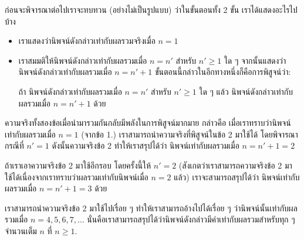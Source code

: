 ก่อน{\wbr}จะ{\wbr}พิจารณา{\wbr}ต่อไป{\wbr}เรา{\wbr}จะ{\wbr}ทบทวน (อย่าง{\wbr}ไม่{\wbr}เป็น{\wbr}รูปแบบ) ว่า{\wbr}ใน{\wbr}ขั้นตอน{\wbr}ทั้ง 2 ขั้น เรา{\wbr}ได้{\wbr}แสดง{\wbr}อะไร{\wbr}ไป{\wbr}บ้าง{\wbr}

\begin{itemize}
\item เรา{\wbr}แสดง{\wbr}ว่า{\wbr}นิพจน์{\wbr}ดังกล่าว{\wbr}เท่า{\wbr}กับ{\wbr}ผลรวม{\wbr}จริง{\wbr}เมื่อ $ n=1 $
\item เรา{\wbr}สมมติ{\wbr}ให้{\wbr}นิพจน์{\wbr}ดังกล่าว{\wbr}เท่า{\wbr}กับ{\wbr}ผลรวม{\wbr}เมื่อ $ n=n' $ สำหรับ $ n'\geq 1 $ ใด ๆ จากนั้น{\wbr}แสดง{\wbr}ว่า{\wbr}นิพจน์{\wbr}ดังกล่าว{\wbr}เท่า{\wbr}กับ{\wbr}ผลรวม{\wbr}เมื่อ $ n=n'+1 $ ขั้นตอน{\wbr}นี้{\wbr}กล่าว{\wbr}ใน{\wbr}อีก{\wbr}ทาง{\wbr}หนึ่ง{\wbr}ก็{\wbr}คือ{\wbr}การ{\wbr}พิสูจน์{\wbr}ว่า:

ถ้า นิพจน์{\wbr}ดังกล่าว{\wbr}เท่า{\wbr}กับ{\wbr}ผลรวม{\wbr}เมื่อ $ n=n' $ สำหรับ $ n'\geq 1 $ ใด ๆ แล้ว นิพจน์{\wbr}ดังกล่าว{\wbr}เท่า{\wbr}กับ{\wbr}ผลรวม{\wbr}เมื่อ $ n=n'+1 $ ด้วย{\wbr}
\end{itemize}

ความจริง{\wbr}ทั้ง{\wbr}สอง{\wbr}ข้อ{\wbr}เมื่อ{\wbr}นำมา{\wbr}รวม{\wbr}กัน{\wbr}กลับ{\wbr}มี{\wbr}พลัง{\wbr}ใน{\wbr}การ{\wbr}พิสูจน์{\wbr}มากมาย กล่าวคือ{\wbr}
เมื่อ{\wbr}เรา{\wbr}ทราบ{\wbr}ว่า{\wbr}นิพจน์{\wbr}เท่า{\wbr}กับ{\wbr}ผลรวม{\wbr}เมื่อ $ n=1 $ (จาก{\wbr}ข้อ 1.)
เรา{\wbr}สามารถ{\wbr}นำ{\wbr}ความจริง{\wbr}ที่{\wbr}พิสูจน์{\wbr}ใน{\wbr}ข้อ 2 มา{\wbr}ใช้ได้ โดย{\wbr}พิจารณา{\wbr}กรณี{\wbr}ที่ $ n'=1 $
ดังนั้น{\wbr}ความจริง{\wbr}ข้อ 2 ทำ{\wbr}ให้{\wbr}เรา{\wbr}สรุป{\wbr}ได้{\wbr}ว่า นิพจน์{\wbr}เท่า{\wbr}กับ{\wbr}ผลรวม{\wbr}เมื่อ $ n=n'+1=2 $

ถ้า{\wbr}เรา{\wbr}เอา{\wbr}ความจริง{\wbr}ข้อ 2 มา{\wbr}ใช้{\wbr}อีก{\wbr}รอบ โดย{\wbr}ครั้งนี้{\wbr}ให้ $ n'=2 $
(สังเกต{\wbr}ว่า{\wbr}เรา{\wbr}สามารถ{\wbr}ความจริง{\wbr}ข้อ 2 มา{\wbr}ใช้ได้{\wbr}เนื่องจาก{\wbr}เรา{\wbr}ทราบ{\wbr}ว่า{\wbr}ผลรวม{\wbr}เท่า{\wbr}กับ{\wbr}นิพจน์{\wbr}เมื่อ $
n=2 $ แล้ว) เรา{\wbr}จะ{\wbr}สามารถ{\wbr}สรุป{\wbr}ได้{\wbr}ว่า นิพจน์{\wbr}เท่า{\wbr}กับ{\wbr}ผลรวม{\wbr}เมื่อ $ n=n'+1=3 $ ด้วย{\wbr}

เรา{\wbr}สามารถ{\wbr}นำ{\wbr}ความจริง{\wbr}ข้อ 2 มา{\wbr}ใช้{\wbr}ไป{\wbr}เรื่อย ๆ ทำ{\wbr}ให้{\wbr}เรา{\wbr}สามารถ{\wbr}อ้าง{\wbr}ไป{\wbr}ได้{\wbr}เรื่อย ๆ
ว่า{\wbr}นิพจน์{\wbr}นั้น{\wbr}เท่า{\wbr}กับ{\wbr}ผลรวม{\wbr}เมื่อ $ n=4,5,6,7,\ldots $
นั่น{\wbr}คือ{\wbr}เรา{\wbr}สามารถ{\wbr}สรุป{\wbr}ได้{\wbr}ว่า{\wbr}นิพจน์{\wbr}ดังกล่าว{\wbr}มี{\wbr}ค่า{\wbr}เท่า{\wbr}กับ{\wbr}ผลรวม{\wbr}สำหรับ{\wbr}ทุก ๆ จำนวนเต็ม $ n $ ที่{\wbr}
$ n\geq 1 $.

